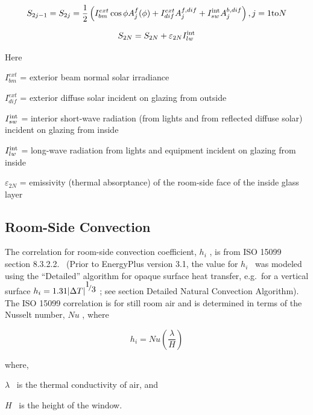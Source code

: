 \begin{equation}
{S_{2j - 1}} = {S_{2j}} = \frac{1}{2}\left( {I_{bm}^{ext}\cos \phi A_j^f(\phi ) + I_{dif}^{ext}A_j^{f,dif} + I_{sw}^{{\mathop{\rm int}} }A_j^{b,dif}} \right),{\rm{     }}j = 1{\rm{ to }}N
\end{equation}

\begin{equation}
{S_{2N}} = {S_{2N}} + {\varepsilon_{2N}}I_{lw}^{{\mathop{\rm int}} }
\end{equation}

Here

\(I_{bm}^{ext}\) = exterior beam normal solar irradiance

\(I_{dif}^{ext}\) = exterior diffuse solar incident on glazing from outside

\(I_{sw}^{{\mathop{\rm int}} }\) = interior short-wave radiation (from lights and from reflected diffuse solar) incident on glazing from inside

\(I_{lw}^{{\mathop{\rm int}} }\) = long-wave radiation from lights and equipment incident on glazing from inside

\({\varepsilon_{2N}}\) = emissivity (thermal absorptance) of the room-side face of the inside glass layer

\subsection{Room-Side Convection}\label{room-side-convection}

The correlation for room-side convection coefficient, \({h_i}\) , is from ISO 15099 section 8.3.2.2.~ (Prior to EnergyPlus version 3.1, the value for \({h_i}\) ~was modeled using the ``Detailed'' algorithm for opaque surface heat transfer, e.g.~for a vertical surface \({h_i} = 1.31{\left| {\Delta T} \right|^{{\raise0.7ex\hbox{1} \!\mathord{\left/ {\vphantom {1 3}}\right.}\!\lower0.7ex\hbox{3}}}}\) ; see section Detailed Natural Convection Algorithm).~ The ISO 15099 correlation is for still room air and is determined in terms of the Nusselt number, \(Nu\) , where

\begin{equation}
{h_i} = Nu\left( {\frac{\lambda }{H}} \right)
\end{equation}

where,

\(\lambda\) ~is the thermal conductivity of air, and

\(H\) ~is the height of the window.


